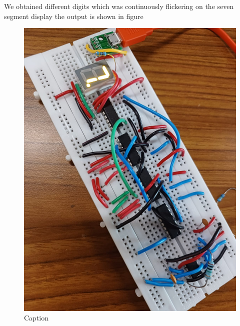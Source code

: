 \documentclass[journal,12pt,twocolumn]{IEEEtran}
\begin{document}
We obtained different digits which was continuously flickering on the seven segment display the output is shown in figure 
\begin{figure}
    \centering
    \includegraphics[width=\linewidth]{figs/clock.jpeg}
    \caption{Caption}
    \label{fig:my_label}
\end{figure}

\section{}
\end{document}
